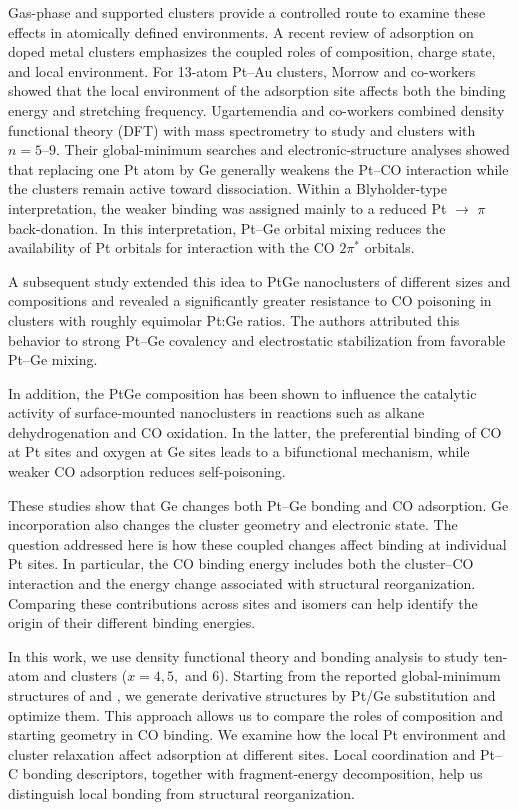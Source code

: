 Gas-phase and supported clusters provide a controlled route to examine these
effects in atomically defined environments. A recent review of 
adsorption on doped metal clusters emphasizes the coupled roles of composition,
charge state, and local environment\cite{ferrari:2020}. For 13-atom Pt--Au
clusters, Morrow and co-workers showed that the local environment of the
adsorption site affects both the  binding energy and stretching
frequency\cite{morrow:2011}. Ugartemendia and co-workers combined density
functional theory (DFT)
with mass spectrometry to study  and  clusters
with $n=5$--9\cite{ugartemendia:2021}. Their global-minimum searches and
electronic-structure analyses showed that replacing one Pt atom by Ge generally
weakens the Pt--CO interaction while the clusters remain active toward
 dissociation. Within a Blyholder-type interpretation, the weaker
 binding was assigned mainly to a reduced Pt $\rightarrow$ 
  $\pi$ back-donation. In this interpretation, Pt–Ge orbital mixing reduces the availability of Pt
orbitals for interaction with the CO \(2\pi^*\) orbitals.

A subsequent study extended this idea to PtGe nanoclusters of different sizes and compositions and
revealed a significantly greater resistance to CO poisoning in clusters with roughly equimolar Pt:Ge
ratios\cite{ugartemendia:2022}. The authors attributed this behavior to 
strong Pt--Ge covalency and electrostatic stabilization from favorable Pt--Ge
mixing.

In addition, the PtGe composition has been shown to influence the catalytic activity of 
surface-mounted nanoclusters in reactions such as alkane dehydrogenation\cite{poths:2023b,li_size:2025} and CO oxidation\cite{ugartemendia:2024}. In the latter, the preferential binding of CO at Pt sites 
and oxygen at Ge sites leads to a bifunctional mechanism, while weaker CO adsorption reduces self-poisoning.

These studies show that Ge changes both Pt--Ge bonding and CO adsorption.
Ge incorporation also changes the cluster geometry and electronic state.
The question addressed here is how these coupled changes affect binding at
individual Pt sites. In particular, the CO binding energy includes both the
cluster--CO interaction and the energy change associated with structural
reorganization. Comparing these contributions across sites and isomers can
help identify the origin of their different binding energies.

In this work, we use density functional theory and bonding analysis to study ten-atom  and  clusters (\(x=4, 5,\) and \(6\)). Starting from the reported global-minimum structures of  and , we generate derivative structures by Pt/Ge substitution and optimize them. This approach allows us to compare the roles of composition and starting geometry in CO binding. We examine how the local Pt environment and cluster relaxation affect adsorption at different sites. Local coordination and Pt–C bonding descriptors, together with fragment-energy decomposition, help us distinguish local bonding from structural reorganization.
